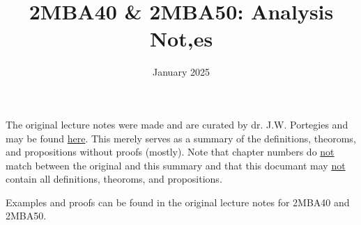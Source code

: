 \documentclass[fleqn]{article}
\title{2MBA40 \& 2MBA50: Analysis Not,es}
\author{}
\date{January 2025}
\newcommand{\ul}[1]{\underline{#1}}
\begin{document}
\maketitle

The original lecture notes were made and are curated by dr. J.W. Portegies and may be found
\href{https://gitlab.tue.nl/jim-portegies/analysis}{here}. This merely
serves as a summary of the definitions, theoroms, and propositions
without proofs (mostly). Note that chapter numbers do \ul{not} match between
the original and this summary and that this documant may \ul{not} contain
all definitions, theoroms, and propositions.

Examples and proofs can be found in the original lecture notes for 2MBA40 and 2MBA50.














\end{document}

